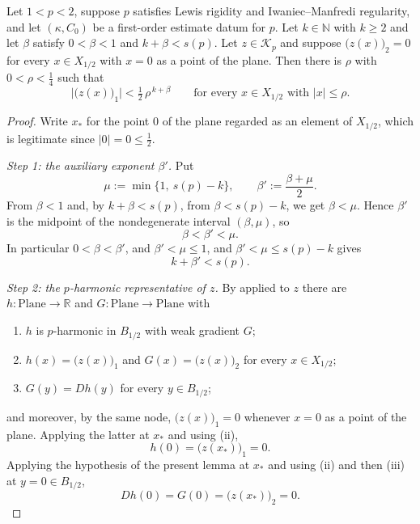 \begin{lemma}
Let $1<p<2$, suppose $p$ satisfies Lewis rigidity and Iwaniec--Manfredi regularity, and let
$(\kappa,C_0)$ be a first-order estimate datum for $p$.  Let $k\in\mathbb{N}$ with $k\ge2$ and
let $\beta$ satisfy $0<\beta<1$ and $k+\beta<s(p)$.  Let $z\in\mathcal{K}_p$ and suppose
$\bigl(z(x)\bigr)_2=0$ for every $x\in X_{1/2}$ with $x=0$ as a point of the plane.  Then there
is $\rho$ with $0<\rho<\tfrac14$ such that
\[
  \bigl\lvert\bigl(z(x)\bigr)_1\bigr\rvert<\tfrac12\,\rho^{\,k+\beta}
  \qquad\text{for every }x\in X_{1/2}\text{ with }\lvert x\rvert\le\rho .
\]
\end{lemma}
\begin{proof}
Write $x_\ast$ for the point $0$ of the plane regarded as an element of $X_{1/2}$, which is
legitimate since $\lvert0\rvert=0\le\tfrac12$.

\medskip\noindent\emph{Step 1: the auxiliary exponent $\beta'$.}
Put
\[
  \mu:=\min\bigl\{1,\ s(p)-k\bigr\},\qquad \beta':=\frac{\beta+\mu}{2}.
\]
From $\beta<1$ and, by $k+\beta<s(p)$, from $\beta<s(p)-k$, we get $\beta<\mu$.  Hence
$\beta'$ is the midpoint of the nondegenerate interval $(\beta,\mu)$, so
\begin{equation}\label{eq:cmd-beta}
  \beta<\beta'<\mu .
\end{equation}
In particular $0<\beta<\beta'$, and $\beta'<\mu\le1$, and $\beta'<\mu\le s(p)-k$ gives
\begin{equation}\label{eq:cmd-sp}
  k+\beta'<s(p).
\end{equation}

\medskip\noindent\emph{Step 2: the $p$-harmonic representative of $z$.}
By  applied to $z$ there are $h\colon\mathrm{Plane}\to\mathbb{R}$
and $G\colon\mathrm{Plane}\to\mathrm{Plane}$ with
\begin{enumerate}
\item[(i)] $h$ is $p$-harmonic in $B_{1/2}$ with weak gradient $G$;
\item[(ii)] $h(x)=\bigl(z(x)\bigr)_1$ and $G(x)=\bigl(z(x)\bigr)_2$ for every $x\in X_{1/2}$;
\item[(iii)] $G(y)=Dh(y)$ for every $y\in B_{1/2}$;
\end{enumerate}
and moreover, by the same node, $\bigl(z(x)\bigr)_1=0$ whenever $x=0$ as a point of the plane.
Applying the latter at $x_\ast$ and using (ii),
\begin{equation}\label{eq:cmd-h0}
  h(0)=\bigl(z(x_\ast)\bigr)_1=0 .
\end{equation}
Applying the hypothesis of the present lemma at $x_\ast$ and using (ii) and then (iii) at
$y=0\in B_{1/2}$,
\begin{equation}\label{eq:cmd-Dh0}
  Dh(0)=G(0)=\bigl(z(x_\ast)\bigr)_2=0 .
\end{equation}


\end{proof}
